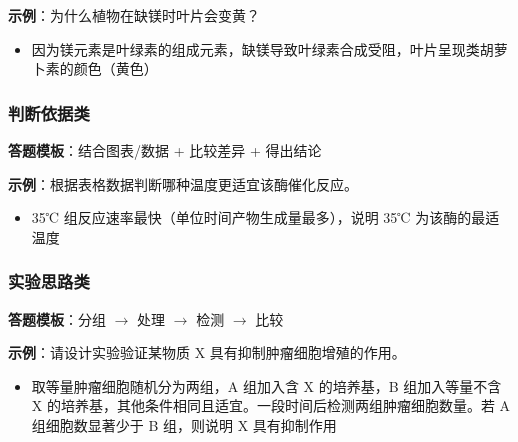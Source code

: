 \textbf{示例}：为什么植物在缺镁时叶片会变黄？
\begin{itemize}
  \item 因为镁元素是叶绿素的组成元素，缺镁导致叶绿素合成受阻，叶片呈现类胡萝卜素的颜色（黄色）
\end{itemize}

\subsubsection{判断依据类}

\textbf{答题模板}：结合图表/数据 + 比较差异 + 得出结论

\textbf{示例}：根据表格数据判断哪种温度更适宜该酶催化反应。
\begin{itemize}
  \item 35℃ 组反应速率最快（单位时间产物生成量最多），说明 35℃ 为该酶的最适温度
\end{itemize}

\subsubsection{实验思路类}

\textbf{答题模板}：分组 $\to$ 处理 $\to$ 检测 $\to$ 比较

\textbf{示例}：请设计实验验证某物质 X 具有抑制肿瘤细胞增殖的作用。
\begin{itemize}
  \item 取等量肿瘤细胞随机分为两组，A 组加入含 X 的培养基，B 组加入等量不含 X 的培养基，其他条件相同且适宜。一段时间后检测两组肿瘤细胞数量。若 A 组细胞数显著少于 B 组，则说明 X 具有抑制作用
\end{itemize}
